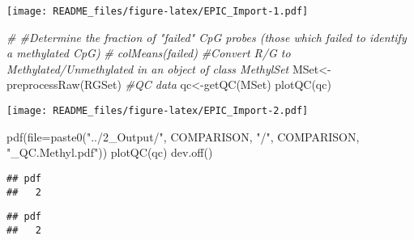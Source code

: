 \documentclass[
  10pt,
]{article}
\newenvironment{Shaded}{\begin{snugshade}}{\end{snugshade}}
\newcommand{\AttributeTok}[1]{\textcolor[rgb]{0.77,0.63,0.00}{#1}}
\newcommand{\CommentTok}[1]{\textcolor[rgb]{0.56,0.35,0.01}{\textit{#1}}}
\newcommand{\DocumentationTok}[1]{\textcolor[rgb]{0.56,0.35,0.01}{\textbf{\textit{#1}}}}
\newcommand{\FunctionTok}[1]{\textcolor[rgb]{0.00,0.00,0.00}{#1}}
\newcommand{\NormalTok}[1]{#1}
\newcommand{\OtherTok}[1]{\textcolor[rgb]{0.56,0.35,0.01}{#1}}
\newcommand{\SpecialCharTok}[1]{\textcolor[rgb]{0.00,0.00,0.00}{#1}}
\newcommand{\StringTok}[1]{\textcolor[rgb]{0.31,0.60,0.02}{#1}}
\begin{document}
\texttt{[image: README\_files/figure-latex/EPIC\_Import-1.pdf]}

\begin{Shaded}
\begin{Highlighting}[]
\CommentTok{\# \#Determine the fraction of "failed" CpG probes (those which failed to identify a methylated CpG)}
\CommentTok{\# colMeans(failed)}
\CommentTok{\#Convert R/G to Methylated/Unmethylated in an object of class MethylSet}
\NormalTok{MSet}\OtherTok{\textless{}{-}}\FunctionTok{preprocessRaw}\NormalTok{(RGSet)}
\CommentTok{\#QC data}
\NormalTok{qc}\OtherTok{\textless{}{-}}\FunctionTok{getQC}\NormalTok{(MSet)}
\FunctionTok{plotQC}\NormalTok{(qc)}
\end{Highlighting}
\end{Shaded}

\texttt{[image: README\_files/figure-latex/EPIC\_Import-2.pdf]}

\begin{Shaded}
\begin{Highlighting}[]
\FunctionTok{pdf}\NormalTok{(}\AttributeTok{file=}\FunctionTok{paste0}\NormalTok{(}\StringTok{"../2\_Output/"}\NormalTok{, COMPARISON, }\StringTok{"/"}\NormalTok{, COMPARISON, }\StringTok{"\_QC.Methyl.pdf"}\NormalTok{))}
\FunctionTok{plotQC}\NormalTok{(qc)}
\FunctionTok{dev.off}\NormalTok{()}
\end{Highlighting}
\end{Shaded}

\begin{verbatim}
## pdf 
##   2
\end{verbatim}

\begin{Shaded}
\end{Shaded}

\begin{verbatim}
## pdf 
##   2
\end{verbatim}
\end{document}
